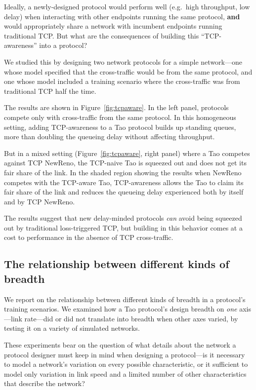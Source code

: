 Ideally, a newly-designed protocol would perform well (e.g.~high
throughput, low delay) when interacting with other endpoints running
the same protocol, \textbf{and} would appropriately share a network
with incumbent endpoints running traditional TCP. But what are the
consequences of building this ``TCP-awareness'' into a protocol?

We studied this by designing two network protocols for a simple
network---one whose model specified that the cross-traffic would be
from the same protocol, and one whose model included a training
scenario where the cross-traffic was from traditional TCP half the
time.

The results are shown in Figure~\ref{fig:tcpaware}. In the left panel,
protocols compete only with cross-traffic from the same protocol. In
this homogeneous setting, adding TCP-awareness to a Tao protocol builds
up standing queues, more than doubling the queueing delay without
affecting throughput.

But in a mixed setting (Figure~\ref{fig:tcpaware}, right panel) where a Tao competes against TCP
NewReno, the TCP-naive Tao is squeezed out and does not get its fair
share of the link. In the shaded region showing the results when
NewReno competes with the TCP-aware Tao, TCP-awareness allows the Tao
to claim its fair share of the link and reduces the queueing delay
experienced both by itself and by TCP NewReno.

The results suggest that new delay-minded protocols \emph{can} avoid
being squeezed out by traditional loss-triggered TCP, but building in
this behavior comes at a cost to performance in the absence of TCP
cross-traffic.

\subsection{The relationship between different kinds of breadth}
\label{ss:parameter}

We report on the relationship between different kinds of breadth in a
protocol's training scenarios. We examined how a Tao protocol's design
breadth on \emph{one} axis---link rate---did or did not translate into
breadth when other axes varied, by testing it on a variety of
simulated networks.

These experiments bear on the question of what details about the network
a protocol designer must keep in mind when designing a protocol---is
it necessary to model a network's variation on every possible
characteristic, or it sufficient to model only variation in link speed
and a limited number of other characteristics that describe the
network?

